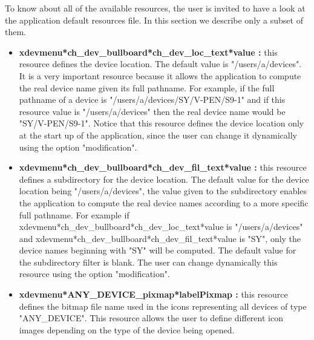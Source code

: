 To know about all of the available resources, the user is invited to have a look
at the application default resources file. In this section we describe only
a subset of them.
\begin{itemize}
\item
{\bf xdevmenu*ch\_dev\_bullboard*ch\_dev\_loc\_text*value : }this resource
defines the device location. The default value is "/users/a/devices". It is
a very important resource because it allows the application to compute the real 
device name given its full pathname. For example, if the full pathname of
a device is "/users/a/devices/SY/V-PEN/S9-1" and if this resource value is
"/users/a/devices" then the real device name would be "SY/V-PEN/S9-1".
Notice that this resource defines the device location only at the start up of
the application, since the user can change it dynamically using the option
"modification".
\item
{\bf xdevmenu*ch\_dev\_bullboard*ch\_dev\_fil\_text*value : } this resource
defines a subdirectory for the device location. The default value for the 
device location being "/users/a/devices", the value given to the subdirectory
enables the application to compute the real device names according to a more
specific full pathname. For example if
xdevmenu*ch\_dev\_bullboard*ch\_dev\_loc\_text*value is "/users/a/devices" 
and xdevmenu*ch\_dev\_bullboard*ch\_dev\_fil\_text*value
 is "SY", only the device names beginning with "SY" will be computed. The default
value for the subdirectory filter is blank. The user can change dynamically
this resource using the option "modification".
\item 
{\bf xdevmenu*ANY\_DEVICE\_pixmap*labelPixmap : } this resource defines the
bitmap file name used in the icons representing all devices of type
"ANY\_DEVICE". This resource allows the user to define different icon images
depending on the type of the device being opened.
\end{itemize}



